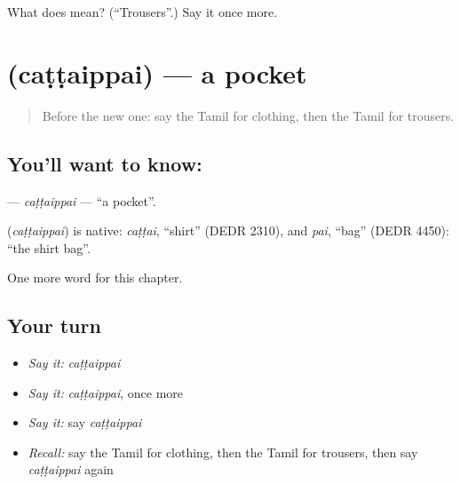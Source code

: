 \begin{tcolorbox}[breakable,colback=teal!4,colframe=teal!35!black,title={Before you move on}]
What does  mean? (\textquotedblleft{}Trousers\textquotedblright{}.) Say it once more.
\end{tcolorbox}
\section[\texorpdfstring{\ta{சட்டைப்பை} (caṭṭaippai)}{சட்டைப்பை (caṭṭaippai)}]{ (caṭṭaippai) — a pocket}

\label{lesson:TA-C242-cattaippai}



\begin{quote}
Before the new one: say the Tamil for clothing, then the Tamil for trousers.
\end{quote}

\subsection*{You'll want to know: }
\textbf{} — \emph{caṭṭaippai} — \textquotedblleft{}a pocket\textquotedblright{}.

\begin{cousinweb}
\textbf{} (\emph{caṭṭaippai}) is native: \emph{caṭṭai}, \textquotedblleft{}shirt\textquotedblright{} (DEDR 2310), and \emph{pai}, \textquotedblleft{}bag\textquotedblright{} (DEDR 4450): \textquotedblleft{}the shirt bag\textquotedblright{}.
\end{cousinweb}

\begin{grammarlens}[title={What you've built}]
One more word for this chapter.
\end{grammarlens}

\subsection*{Your turn}
\begin{itemize}
\raggedright
  \item \emph{Say it:} \emph{caṭṭaippai}
  \item \emph{Say it:} \emph{caṭṭaippai}, once more
  \item \emph{Say it:} say \emph{caṭṭaippai}
  \item \emph{Recall:} say the Tamil for clothing, then the Tamil for trousers, then say \emph{caṭṭaippai} again
\end{itemize}

